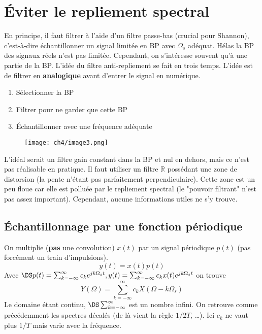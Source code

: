 	
\section{Éviter le repliement spectral}
En principe, il faut filtrer à l'aide d'un filtre passe-bas (crucial pour Shannon), c'est-à-dire 
échantillonner un signal limitée en BP avec $\Omega_s$ adéquat. Hélas la BP des signaux réels n'est 
pas limitée. Cependant, on s'intéresse souvent qu'à une partie de la BP. L'idée du filtre 
anti-repliement se fait en trois temps. L'idée est de filtrer en \textbf{analogique} avant d'entrer 
le signal en numérique.
\begin{enumerate}
\item Sélectionner la BP
\item Filtrer pour ne garder que cette BP
\item Échantillonner avec une fréquence adéquate
\end{enumerate}
\newpage

	\begin{wrapfigure}[10]{l}{7cm}
	\texttt{[image: ch4/image3.png]}
	\end{wrapfigure}	
L'idéal serait un filtre gain constant dans la BP et nul en dehors, mais ce n'est pas réalisable 
en pratique. Il faut utiliser un filtre $\mathbb{R}$ possédant une zone de distorsion (la pente 
n'étant pas parfaitement perpendiculaire). Cette zone est un peu floue car elle est polluée par 
le repliement spectral (le "pouvoir filtrant" n'est pas assez important). Cependant, aucune informations 
utiles ne s'y trouve. 

	\subsection{Échantillonnage par une fonction périodique}
	On multiplie (\textbf{pas} une convolution) $x(t)$ par un signal périodique $p(t)$ (pas 
	forcément un train d'impulsions).
	\begin{equation}
	y(t) = x(t)p(t)
	\end{equation}
	Avec $\DS p(t) = \sum_{k=-\infty}^\infty c_ke^{jk\Omega_st}, y(t) =  \sum_{k=-\infty}^\infty 
	c_kx(t)e^{jk\Omega_st}$ on trouve
	\begin{equation}
	Y(\Omega) = \sum_{k=-\infty}^\infty c_k X(\Omega-k\Omega_s)
	\end{equation}
	Le domaine étant continu, $\DS \sum_{k=-\infty}^\infty$ est un nombre infini. On retrouve 
	comme précédemment les spectres décalés (de là vient la règle $1/2T$, \dots). Ici $c_k$ ne 
	vaut plus $1/T$ mais varie avec la fréquence.
	
